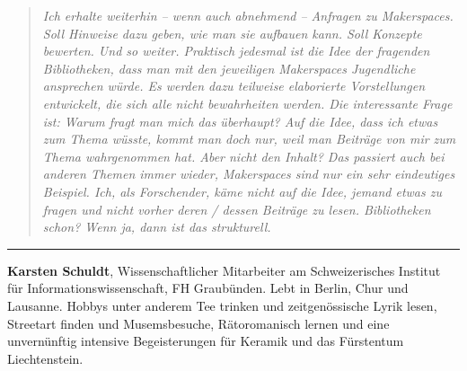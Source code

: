 \documentclass[a4paper,
fontsize=11pt,
oneside,
numbers=noperiodatend,
parskip=half-,
bibliography=totoc,
final
]{scrartcl}
\begin{document}
\begin{quote}
\emph{Ich erhalte weiterhin -- wenn auch abnehmend -- Anfragen zu
Makerspaces. Soll Hinweise dazu geben, wie man sie aufbauen kann. Soll
Konzepte bewerten. Und so weiter. Praktisch jedesmal ist die Idee der
fragenden Bibliotheken, dass man mit den jeweiligen Makerspaces
Jugendliche ansprechen würde. Es werden dazu teilweise elaborierte
Vorstellungen entwickelt, die sich alle nicht bewahrheiten werden. Die
interessante Frage ist: Warum fragt man mich das überhaupt? Auf die
Idee, dass ich etwas zum Thema wüsste, kommt man doch nur, weil man
Beiträge von mir zum Thema wahrgenommen hat. Aber nicht den Inhalt? Das
passiert auch bei anderen Themen immer wieder, Makerspaces sind nur ein
sehr eindeutiges Beispiel. Ich, als Forschender, käme nicht auf die
Idee, jemand etwas zu fragen und nicht vorher deren / dessen Beiträge zu
lesen. Bibliotheken schon? Wenn ja, dann ist das strukturell.}
\end{quote}

\begin{center}\rule{0.5\linewidth}{0.5pt}\end{center}

\textbf{Karsten Schuldt}, Wissenschaftlicher Mitarbeiter am
Schweizerisches Institut für Informationswissenschaft, FH Graubünden.
Lebt in Berlin, Chur und Lausanne. Hobbys unter anderem Tee trinken und
zeitgenössische Lyrik lesen, Streetart finden und Musemsbesuche,
Rätoromanisch lernen und eine unvernünftig intensive Begeisterungen für
Keramik und das Fürstentum Liechtenstein.
\end{document}
